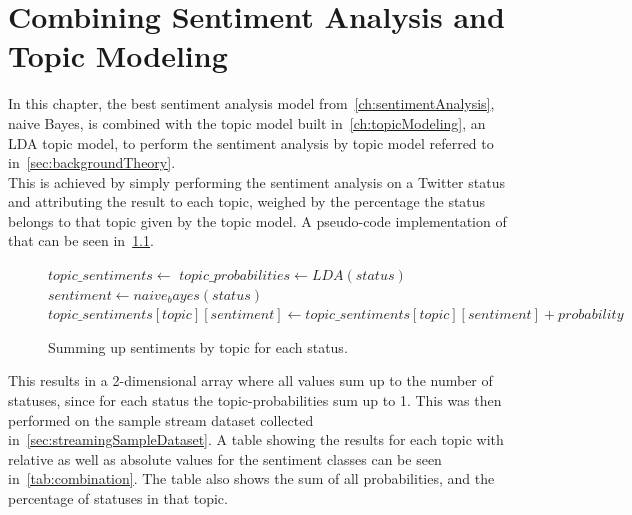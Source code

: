 \chapter{Combining Sentiment Analysis and Topic Modeling}
\label{ch:combiningSentimentAnalysisAndTopicModeling}


In this chapter, the best sentiment analysis model from~\ref{ch:sentimentAnalysis}, naive Bayes,
is combined with the topic model built in~\ref{ch:topicModeling}, an LDA topic model,
to perform the sentiment analysis by topic model referred to in~\ref{sec:backgroundTheory}.
\\
This is achieved by simply performing the sentiment analysis on a Twitter status and attributing the result to each topic,
weighed by the percentage the status belongs to that topic given by the topic model.
A pseudo-code implementation of that can be seen in~\ref{pseudo_code:sentiment_topic_summing}.

\begin{figure}
    \caption{Summing up sentiments by topic for each status.}
    \label{pseudo_code:sentiment_topic_summing}
    \begin{algorithmic}
        \State $topic\_sentiments \gets {}$ %
            \State $topic\_probabilities \gets LDA(status)$
            \State $sentiment \gets naive_bayes(status)$
                \State $topic\_sentiments[topic][sentiment] \gets topic\_sentiments[topic][sentiment] + probability$
            \EndFor
        \EndFor
    \end{algorithmic}
\end{figure}

This results in a 2-dimensional array where all values sum up to the number of statuses,
since for each status the topic-probabilities sum up to 1.
This was then performed on the sample stream dataset collected in~\ref{sec:streamingSampleDataset}.
A table showing the results for each topic with relative as well as absolute values for the sentiment classes  can be seen in~\ref{tab:combination}.
The table also shows the sum of all probabilities, and the percentage of statuses in that topic.

